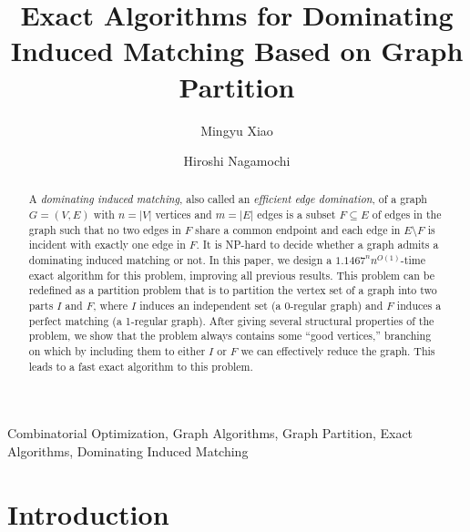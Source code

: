 \documentclass{elsart_TR2}
\begin{document}
\begin{frontmatter}
\title{Exact Algorithms for Dominating Induced Matching Based on Graph Partition}
\author{Mingyu Xiao}
\address{School of Computer Science and Engineering\\
University of Electronic Science and Technology of China\\
Chengdu 611731, China}
\author{Hiroshi Nagamochi}
\address{Department of Applied Mathematics and Physics\\
Graduate School of Informatics\\
Kyoto University\\
Yoshida Honmachi, Sakyo, Kyoto 606-8501, Japan}


\begin{abstract}
A \emph{dominating induced matching}, also called an \emph{efficient edge domination}, of a graph $G=(V,E)$ with $n=|V|$ vertices and $m=|E|$ edges
is a subset $F \subseteq E$ of edges in the graph such
that no two edges in $F$ share a common endpoint and each edge in $E\setminus F$ is incident with exactly one edge in $F$. It is NP-hard to decide whether a graph admits a dominating induced matching or not. In this paper, we design a $1.1467^nn^{O(1)}$-time exact algorithm for this problem, improving all previous results.
This problem can be redefined as a partition problem that is to partition the vertex set of a graph into two parts $I$ and $F$, where $I$ induces an independent set (a 0-regular graph) and $F$ induces
a perfect matching (a 1-regular graph).
After giving several structural properties of the problem, we show that the problem always contains some ``good vertices,'' branching on which by including them to either $I$ or $F$ we can effectively reduce the graph. This leads to a fast exact algorithm to this problem.

\end{abstract}


\begin{keyword}
Combinatorial Optimization, Graph Algorithms, Graph Partition, Exact Algorithms, Dominating Induced Matching
\end{keyword}
\end{frontmatter}




\section{Introduction}
\end{document}

